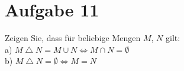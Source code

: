 \section*{Aufgabe 11}

Zeigen Sie, dass für beliebige Mengen $M$, $N$ gilt:\\

a) $M \bigtriangleup N = M \cup N \Leftrightarrow M \cap N = \emptyset$\\

b) $M \bigtriangleup N = \emptyset \Leftrightarrow M = N$